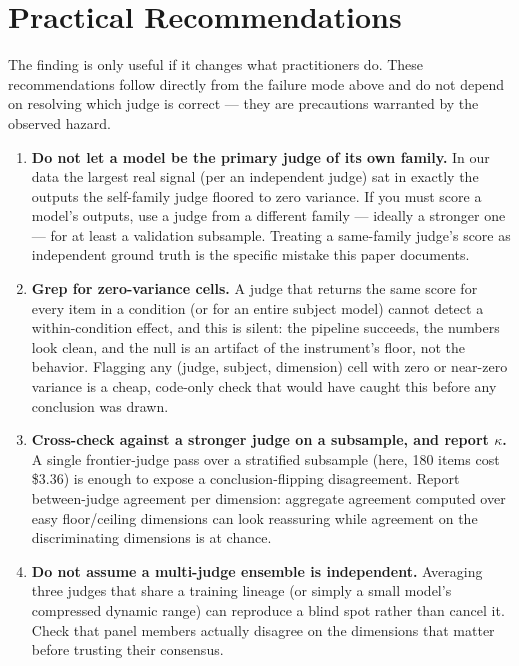 \section{Practical Recommendations}
\label{sec:recs}

The finding is only useful if it changes what practitioners do. These
recommendations follow directly from the failure mode above and do not depend on
resolving which judge is correct --- they are precautions warranted by the
observed hazard.

\begin{enumerate}
\item \textbf{Do not let a model be the primary judge of its own family.} In our
data the largest real signal (per an independent judge) sat in exactly the
outputs the self-family judge floored to zero variance. If you must score a
model's outputs, use a judge from a different family --- ideally a stronger one
--- for at least a validation subsample. Treating a same-family judge's score as
independent ground truth is the specific mistake this paper documents.

\item \textbf{Grep for zero-variance cells.} A judge that returns the same score
for every item in a condition (or for an entire subject model) cannot detect a
within-condition effect, and this is silent: the pipeline succeeds, the numbers
look clean, and the null is an artifact of the instrument's floor, not the
behavior. Flagging any (judge, subject, dimension) cell with zero or near-zero
variance is a cheap, code-only check that would have caught this before any
conclusion was drawn.

\item \textbf{Cross-check against a stronger judge on a subsample, and report
$\kappa$.} A single frontier-judge pass over a stratified subsample (here, 180
items cost \$3.36) is enough to expose a conclusion-flipping disagreement.
Report between-judge agreement per dimension: aggregate agreement computed over
easy floor/ceiling dimensions can look reassuring while agreement on the
discriminating dimensions is at chance.

\item \textbf{Do not assume a multi-judge ensemble is independent.} Averaging
three judges that share a training lineage (or simply a small model's compressed
dynamic range) can reproduce a blind spot rather than cancel it. Check that
panel members actually disagree on the dimensions that matter before trusting
their consensus.


\end{enumerate}
